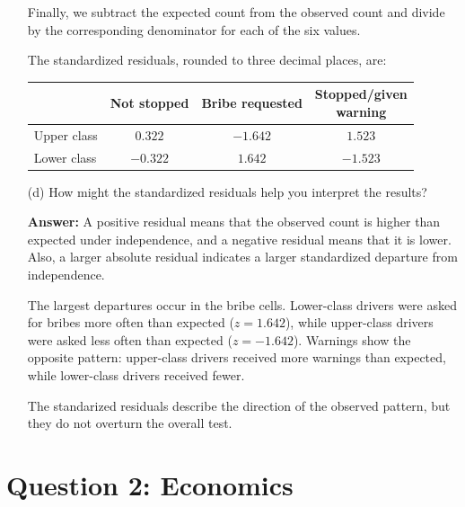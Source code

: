 \documentclass[12pt,letterpaper]{article}
\begin{document}
\begin{enumerate}
		
		
		Finally, we subtract the expected count from the observed count and divide
		by the corresponding denominator for each of the six values.
		
		
		
		The standardized residuals, rounded to three decimal places, are:
		
		\begin{center}
			\begin{tabular}{l | c c c}
				& Not stopped & Bribe requested & \shortstack{Stopped/given\\warning} \\
				\hline
				Upper class & $0.322$ & $-1.642$ & $1.523$ \\
				Lower class & $-0.322$ & $1.642$ & $-1.523$ \\
				\hline
			\end{tabular}
		\end{center}
		
		\newpage
		\item [(d)] How might the standardized residuals help you interpret the results?
		
		\vspace{.25cm}
		\textbf{Answer:} A positive residual means that the observed count is higher
		than expected under independence, and a negative residual means that it is lower. Also, a larger absolute residual indicates a larger standardized departure from independence.
		
		The largest departures occur in the bribe cells. Lower-class drivers
		were asked for bribes more often than expected ($z=1.642$), while upper-class drivers were asked less often than expected ($z=-1.642$).  Warnings show the opposite pattern: upper-class drivers received more warnings than expected, while lower-class drivers received fewer.
		
		The standarized residuals describe the direction of the observed pattern, but they do not overturn the overall test.
	\end{enumerate}
	
	\newpage
	\section{Question 2: Economics}
	
\end{document}
